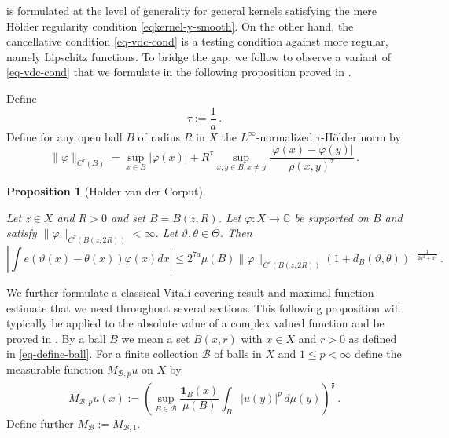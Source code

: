 \documentclass[10pt,a4paper]{article}
\theoremstyle{plain}
\newtheorem{proposition}[theorem]{Proposition}
\theoremstyle{definition}
\numberwithin{equation}{subsection}
\newcommand{\mfa}{{\vartheta}}
\newcommand{\mfb}{{\theta}}
\newcommand{\Mf}{{\Theta}}
\newcommand{\lean}[1]{}
\newcommand{\uses}[1]{}
\newcommand{\leanok}{}
\begin{document}
 is formulated at the level of generality
for general kernels satisfying the mere H\"older regularity condition \eqref{eqkernel-y-smooth}. On the other hand, the cancellative condition \eqref{eq-vdc-cond} is a testing condition against more regular,
namely Lipschitz functions. To bridge the gap, we follow \cite{zk-polynomial} to observe a variant of \eqref{eq-vdc-cond} that we formulate
in the following proposition proved in .


Define
\begin{equation}
    \tau:=\frac 1a\, .
\end{equation}
Define for any open ball $B$ of radius $R$ in $X$ the $L^\infty$-normalized $\tau$-H\"older norm by
\begin{equation}
    \label{eq-Holder-norm}
    \|\varphi\|_{C^\tau(B)} = \sup_{x \in B} |\varphi(x)| + R^\tau \sup_{x,y \in B, x \neq y} \frac{|\varphi(x) - \varphi(y)|}{\rho(x,y)^\tau}\,.
\end{equation}


\begin{proposition}[Holder van der Corput]
    \label{Holder-van-der-Corput}
    \leanok
    \lean{holder_van_der_corput}
    \uses{Lipschitz-Holder-approximation}
     Let $z\in X$ and $R>0$ and set $B=B(z,R)$.
     Let $\varphi: X \to \mathbb{C}$ be
     supported on $B$ and satisfy $\|{\varphi}\|_{C^\tau(B(z, 2R))}<\infty$.
     Let $\mfa, \mfb \in \Mf$. Then
    \begin{equation}
        \label{eq-vdc-cond-tau-2}
        |\int e(\mfa(x)-{\mfb(x)})\varphi(x) dx|\le
         2^{7a} \mu(B) \|{\varphi}\|_{C^\tau(B(z, 2R))}
       (1 + d_{B}(\mfa,\mfb))^{-\frac{1}{2a^2+a^3}}
    \,.
    \end{equation}
\end{proposition}

We further formulate a classical Vitali covering result
and maximal function estimate that we need throughout several sections.
This following proposition will typically be applied to the absolute value of a complex valued function and be proved in . By a ball $B$ we mean a set $B(x,r)$ with $x\in X$
and $r>0$ as defined in \eqref{eq-define-ball}.
For a finite collection $\mathcal{B}$ of balls in $X$
and $1\le p< \infty$ define the measurable function $M_{\mathcal{B},p}u$ on $X$ by
\begin{equation}\label{def-hlm}
    M_{\mathcal{B},p}u(x):=\left(\sup_{B\in \mathcal{B}} \frac{\mathbf{1}_{B}(x)}{\mu(B)}\int _{B} |u(y)|^p\, d\mu(y)\right)^\frac 1p\, .
\end{equation}
Define further $M_{\mathcal{B}}:=M_{\mathcal{B},1}$.
\end{document}
